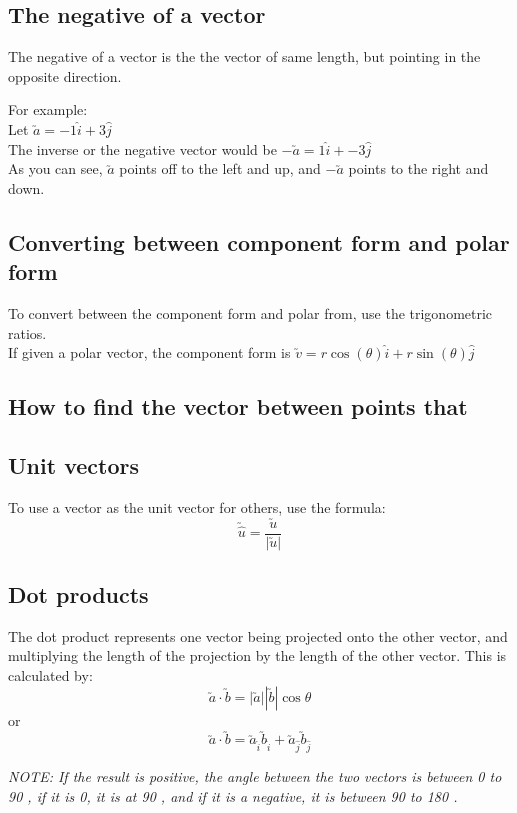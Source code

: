 \documentclass[a4paper,10pt]{report}
\newcommand{\note}[1]{\begin{center}\emph{NOTE: {#1}}\end{center}}
\newenvironment{example}{For example:\\}{}
\begin{document}
\subsection{The negative of a vector}
The negative of a vector is the the vector of same length, but pointing in the opposite direction.

\begin{example}
	Let $\utilde{a} = -1\hat{i} + 3\hat{j}$\\
	The inverse or the negative vector would be $-\utilde{a} = 1\hat{i} + -3\hat{j}$\\
	As you can see, $\utilde{a}$ points off to the left and up, and $-\utilde{a}$ points to the right and down.
\end{example}

\subsection{Converting between component form and polar form}
To convert between the component form and polar from, use the trigonometric ratios.\\
If given a polar vector, the component form is $\utilde{v} = r\cos(\theta)\hat{i} + r\sin(\theta)\hat{j}$

\subsection{How to find the vector between points that}

\subsection{Unit vectors}
To use a vector as the unit vector for others, use the formula:
$$
	\utilde{\hat{u}} = \frac{\utilde{u}}{|\utilde{u}|}
$$

\subsection{Dot products}
The dot product represents one vector being projected onto the other vector, and multiplying the length of the projection by the length of the other vector.  This is calculated by:
$$\utilde{a} \cdot \utilde{b} = |\utilde{a}||\utilde{b}|\cos\theta$$
or
$$\utilde{a} \cdot \utilde{b} = \utilde{a}_{\hat{i}} \utilde{b}_{\hat{i}} + \utilde{a}_{\hat{j}} \utilde{b}_{\hat{j}}$$

\note{If the result is positive, the angle between the two vectors is between 0 to 90 \degree, if it is 0, it is at 90 \degree, and if it is a negative, it is between 90 to 180 \degree.}
\end{document}
